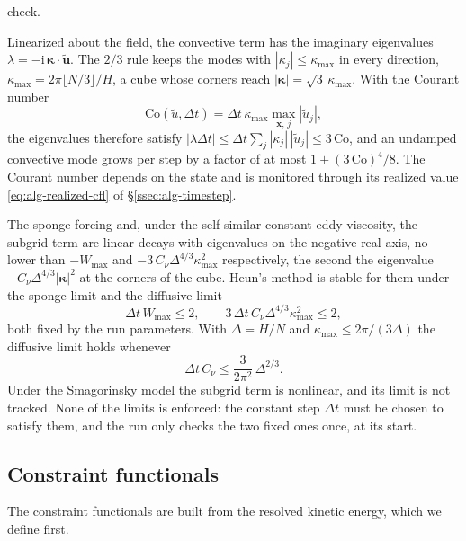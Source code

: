 \documentclass{article}
\begin{document}
check.
\par
Linearized about the field, the convective term has the imaginary
eigenvalues $\lambda = -\mathrm{i}\, \boldsymbol{\kappa} \cdot \tilde{\mathbf{u}}$.
The $2/3$ rule keeps the modes with $|\kappa_j| \le \kappa_{\max}$ in every
direction, $\kappa_{\max} = 2\pi \lfloor N/3 \rfloor / H$, a cube whose corners
reach $|\boldsymbol{\kappa}| = \sqrt{3}\, \kappa_{\max}$. With the Courant number
\begin{equation}\label{eq:ns-courant}
  \mathrm{Co}(\tilde u, \Delta t) = \Delta t\, \kappa_{\max} \max_{\mathbf{x},\, j} |\tilde u_j|,
\end{equation}
the eigenvalues therefore satisfy
$|\lambda \Delta t| \le \Delta t \sum_j |\kappa_j|\, |\tilde u_j| \le 3\, \mathrm{Co}$,
and an undamped convective mode grows per step by a factor of at most
$1 + (3\,\mathrm{Co})^4/8$. The Courant number depends on the state and is
monitored through its realized value \eqref{eq:alg-realized-cfl} of
\S\ref{ssec:alg-timestep}.
\par
The sponge forcing and, under the self-similar constant eddy viscosity, the
subgrid term are linear decays with eigenvalues on the negative real axis,
no lower than $-W_{\max}$ and $-3\, C_\nu \Delta^{4/3} \kappa_{\max}^2$
respectively, the second the eigenvalue
$-C_\nu \Delta^{4/3} |\boldsymbol{\kappa}|^2$ at the corners of the cube.
Heun's method is stable for them under the sponge limit and the diffusive
limit
\begin{equation}\label{eq:ns-sponge-limit}
  \Delta t\, W_{\max} \le 2,
  \qquad
  3\, \Delta t\, C_\nu \Delta^{4/3} \kappa_{\max}^2 \le 2,
\end{equation}
both fixed by the run parameters. With $\Delta = H/N$ and
$\kappa_{\max} \le 2\pi/(3\Delta)$ the diffusive limit holds whenever
\begin{equation}\label{eq:ns-diffusive-limit}
  \Delta t\, C_\nu \le \frac{3}{2\pi^2}\, \Delta^{2/3} .
\end{equation}
Under the Smagorinsky model the subgrid term is nonlinear, and its limit is
not tracked. None of the limits is enforced: the constant step $\Delta t$ must
be chosen to satisfy them, and the run only checks the two fixed ones once,
at its start.

\subsection{Constraint functionals}\label{ssec:ns-constraints}
The constraint functionals are built from the resolved kinetic energy, which
we define first.
\end{document}
